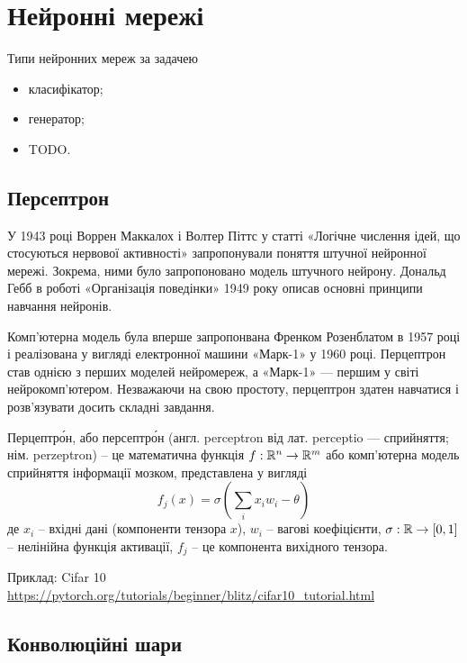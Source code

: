\section{Нейронні мережі}

Типи нейронних мереж за задачею

\begin{itemize}
 \item класифікатор;
 \item генератор; 
 \item TODO.
\end{itemize}


\subsection{Персептрон}

У 1943 році Воррен Маккалох і Волтер Піттс у статті «Логічне числення ідей, що стосуються нервової активності» запропонували поняття штучної нейронної мережі. Зокрема, ними було запропоновано модель штучного нейрону. Дональд Гебб в роботі «Організація поведінки» 1949 року описав основні принципи навчання нейронів. 

Комп'ютерна модель була вперше запропонвана Френком Розенблатом в 1957 році і реалізована у вигляді електронної машини «Марк-1» у 1960 році. Перцептрон став однією з перших моделей нейромереж, а «Марк-1» — першим у світі нейрокомп'ютером. Незважаючи на свою простоту, перцептрон здатен навчатися і розв'язувати досить складні завдання.

\begin{ozn}
Перцептро́н, або персептро́н (англ. perceptron від лат. perceptio — сприйняття; нім. perzeptron) -- це математична функція $f: \Bbb R^n \rightarrow \Bbb R^m$ або комп'ютерна модель сприйняття інформації мозком, представлена у вигляді
\begin{equation}
 f_j(x) = \sigma (\sum_i x_i w_i - \theta)
\end{equation}
де $x_i$ -- вхідні дані (компоненти тензора $x$),  $w_i$ -- вагові коефіцієнти, $\sigma: \Bbb R \rightarrow [0, 1]$ -- нелінійна функція активації, $f_j$ -- це компонента вихідного тензора.
\end{ozn}


Приклад: Cifar 10 \url{https://pytorch.org/tutorials/beginner/blitz/cifar10_tutorial.html}


\subsection{Конволюційні шари}


